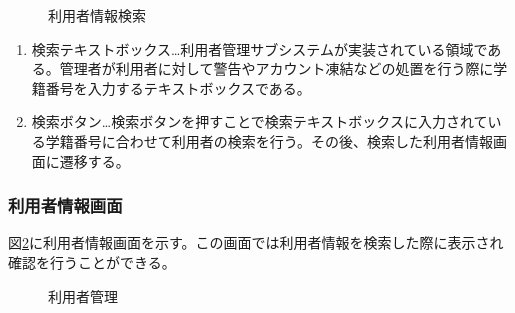 \documentclass[a4j]{jarticle}
\begin{document}
\begin{figure}[H]
\centering
{}
\caption{利用者情報検索}
\label{fig:search_user}
\end{figure}

\begin{enumerate}
  \renewcommand{\labelenumi}{\textcircled{\scriptsize \theenumi}}

\item 検索テキストボックス…利用者管理サブシステムが実装されている領域である。管理者が利用者に対して警告やアカウント凍結などの処置を行う際に学籍番号を入力するテキストボックスである。

\item 検索ボタン…検索ボタンを押すことで検索テキストボックスに入力されている学籍番号に合わせて利用者の検索を行う。その後、検索した利用者情報画面に遷移する。


\end{enumerate}


\subsubsection{利用者情報画面}
図\ref{fig:user_info}に利用者情報画面を示す。この画面では利用者情報を検索した際に表示され確認を行うことができる。
\begin{figure}[H]
\centering
{}
\caption{利用者管理}
\label{fig:user_info}
\end{figure}
\end{document}
